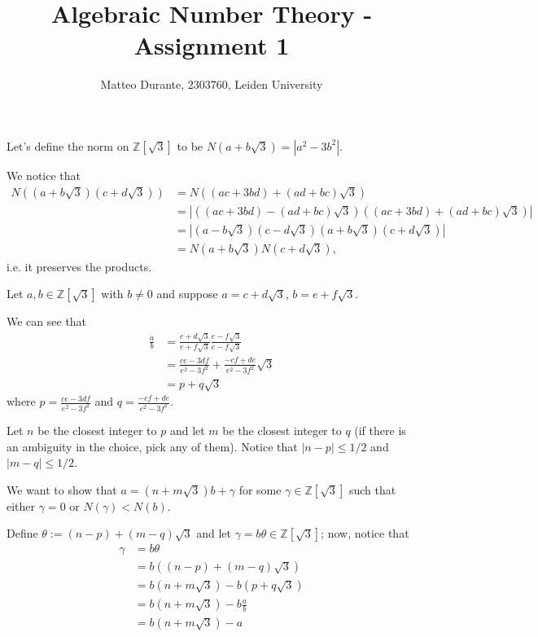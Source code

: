 \documentclass{article}
\newcommand{\numberset}{\mathbb}
\newcommand{\Z}{\numberset{Z}}
\newcommand{\exercise}[1]{\noindent {\bf Exercise #1}}
\begin{document}
\title{Algebraic Number Theory - Assignment 1}

\author{Matteo Durante, 2303760, Leiden University}

\maketitle


\exercise{8}

Let's define the norm on $\mathbb Z[\sqrt 3]$ to be $N(a + b \sqrt 3) = |a^2 - 3 b^2|$.

We notice that
\begin{align*}
		N((a+b\sqrt{3})(c+d\sqrt{3})) & = N((ac+3bd)+(ad+bc)\sqrt{3}) \\
		& =|((ac+3bd)-(ad+bc)\sqrt{3})((ac+3bd)+(ad+bc)\sqrt{3})| \\
		& =|(a-b\sqrt{3})(c-d\sqrt{3})(a+b\sqrt{3})(c+d\sqrt{3})| \\
		& =N(a+b\sqrt{3})N(c+d\sqrt{3}),
\end{align*}
i.e. it preserves the products.

Let $a,b\in\Z[\sqrt 3]$ with $b\neq 0$ and suppose $a = c + d \sqrt{3}$, $b = e + f \sqrt{3}$.

We can see that 
\begin{align*}
		\frac a b &= \frac{c + d \sqrt 3}{e + f \sqrt 3} \frac{e - f \sqrt 3}{e - f \sqrt 3} \\
		& = \frac{ce-3df}{e^2 - 3f^2} + \frac{-cf + de}{e^2 - 3f^2} \sqrt 3 \\
		& = p + q\sqrt 3
\end{align*}
where $p = \displaystyle \frac{ce - 3df}{e^2 - 3f^2}$ and $q = \displaystyle \frac{-cf + de}{e^2 - 3f^2}$.

Let $n$ be the closest integer to $p$ and let $m$ be the closest integer to $q$ (if there is an ambiguity in the choice, pick any of them). Notice that $| n - p | \leq 1/2$ and $| m - q | \leq 1/2$.

We want to show that $a = (n + m\sqrt 3) b + \gamma$ for some $\gamma \in \mathbb Z[\sqrt 3]$ such that either $\gamma = 0$ or $N(\gamma) < N(b)$.

Define $\theta := (n - p) + (m - q)\sqrt 3$ and let $\gamma = b \theta \in \mathbb Z[\sqrt 3]$; now, notice  that
\begin{align*}
		\gamma & = b \theta \\
		& = b ( (n - p) + (m - q)\sqrt 3) \\
		& = b (n + m\sqrt 3) - b(p + q\sqrt 3) \\
		& = b (n + m\sqrt 3) - b \frac a b \\
		& = b (n + m\sqrt 3) - a
\end{align*}
\end{document}
